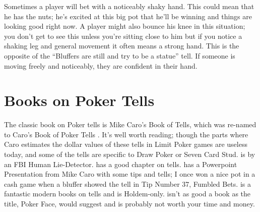 Sometimes a player will bet with a noticeably shaky hand. This could
mean that he has the nuts; he's excited at this big pot that he'll be
winning and things are looking good right now. A player might also
bounce his knee in this situation; you don't get to see this unless
you're sitting close to him but if you notice a shaking leg and
general movement it often means a strong hand. This is the opposite of
the ``Bluffers are still and try to be a statue'' tell. If someone is
moving freely and noticeably, they are confident in their hand.

\section{Books on Poker Tells}


The classic book on Poker tells is Mike Caro's Book of Tells, which
was re-named to Caro's Book of Poker Tells \citep{CaroTells}. It's well
worth reading; though the parts where Caro estimates the dollar values
of these tells in Limit Poker games are useless today, and some of
the tells are specific to Draw Poker or Seven Card Stud.
\citep{Navarro} is by an FBI Human Lie-Detector. \citep{Gospellier}
has a good chapter on tells. \citep{Brunson} has a Powerpoint
Presentation from Mike Caro with some tips and  tells; I once won a
nice pot in a cash game when a bluffer showed the tell in Tip Number
37, Fumbled Bets. \citep{Elwood} is a fantastic modern books on tells
and is Holdem-only. \citep{James} isn't as good a book as the title,
Poker Face, would suggest and is probably not worth your time and
money.
